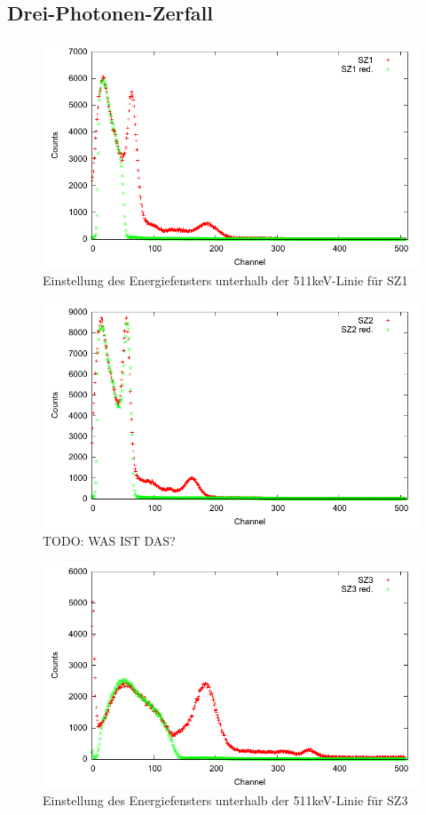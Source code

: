\subsection{Drei-Photonen-Zerfall}

\begin{figure}
 \includegraphics[width=\textwidth]{Graphen/3er/red-spektrum-sz1.pdf}
 \caption{Einstellung des Energiefensters unterhalb der 511keV-Linie für SZ1}
\end{figure}

\begin{figure}
 \includegraphics[width=\textwidth]{Graphen/3er/red-spektrum-sz2.pdf}
 \caption{TODO: WAS IST DAS?}
\end{figure}

\begin{figure}
 \includegraphics[width=\textwidth]{Graphen/3er/red-spektrum-sz3.pdf}
 \caption{Einstellung des Energiefensters unterhalb der 511keV-Linie für SZ3}
\end{figure}

